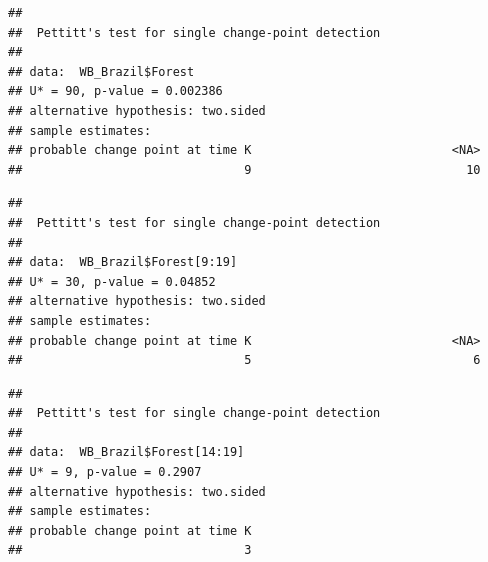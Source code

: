 \documentclass[12pt,]{article}
\newenvironment{Shaded}{\begin{snugshade}}{\end{snugshade}}
\newcommand{\KeywordTok}[1]{\textcolor[rgb]{0.13,0.29,0.53}{\textbf{#1}}}
\newcommand{\DecValTok}[1]{\textcolor[rgb]{0.00,0.00,0.81}{#1}}
\newcommand{\CommentTok}[1]{\textcolor[rgb]{0.56,0.35,0.01}{\textit{#1}}}
\newcommand{\OperatorTok}[1]{\textcolor[rgb]{0.81,0.36,0.00}{\textbf{#1}}}
\newcommand{\NormalTok}[1]{#1}
\begin{document}
\begin{Shaded}
\end{Shaded}

\begin{verbatim}
## 
##  Pettitt's test for single change-point detection
## 
## data:  WB_Brazil$Forest
## U* = 90, p-value = 0.002386
## alternative hypothesis: two.sided
## sample estimates:
## probable change point at time K                            <NA> 
##                               9                              10
\end{verbatim}

\begin{Shaded}
\end{Shaded}

\begin{verbatim}
## 
##  Pettitt's test for single change-point detection
## 
## data:  WB_Brazil$Forest[9:19]
## U* = 30, p-value = 0.04852
## alternative hypothesis: two.sided
## sample estimates:
## probable change point at time K                            <NA> 
##                               5                               6
\end{verbatim}

\begin{Shaded}
\end{Shaded}

\begin{verbatim}
## 
##  Pettitt's test for single change-point detection
## 
## data:  WB_Brazil$Forest[14:19]
## U* = 9, p-value = 0.2907
## alternative hypothesis: two.sided
## sample estimates:
## probable change point at time K 
##                               3
\end{verbatim}
\end{document}
